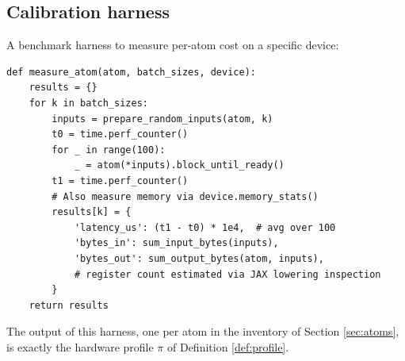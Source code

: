 \subsection{Calibration harness}

A benchmark harness to measure per-atom cost on a
specific device:

\begin{lstlisting}
def measure_atom(atom, batch_sizes, device):
    results = {}
    for k in batch_sizes:
        inputs = prepare_random_inputs(atom, k)
        t0 = time.perf_counter()
        for _ in range(100):
            _ = atom(*inputs).block_until_ready()
        t1 = time.perf_counter()
        # Also measure memory via device.memory_stats()
        results[k] = {
            'latency_us': (t1 - t0) * 1e4,  # avg over 100
            'bytes_in': sum_input_bytes(inputs),
            'bytes_out': sum_output_bytes(atom, inputs),
            # register count estimated via JAX lowering inspection
        }
    return results
\end{lstlisting}

The output of this harness, one per atom in the
inventory of Section \ref{sec:atoms}, is exactly
the hardware profile $\pi$ of
Definition \ref{def:profile}.
